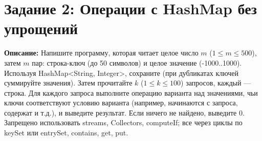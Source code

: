 \documentclass[12pt]{article}
\begin{document}
\section*{Задание 2: Операции с HashMap без упрощений}
  \textbf{Описание:} Напишите программу, которая читает целое число $m$ ($1 \leq m \leq 500$), затем $m$ пар: строка-ключ (до 50 символов) и целое значение (-1000..1000). Используя HashMap<String, Integer>, сохраните (при дубликатах ключей суммируйте значения). Затем прочитайте $k$ ($1 \leq k \leq 100$) запросов, каждый — строка. Для каждого запроса выполните операцию варианта над значениями, чьи ключи соответствуют условию варианта (например, начинаются с запроса, содержат и т.д.), и выведите результат. Если ничего не найдено, выведите 0. Запрещено использовать streams, Collectors, computeIf; все через циклы по keySet или entrySet, contains, get, put.
\end{document}
